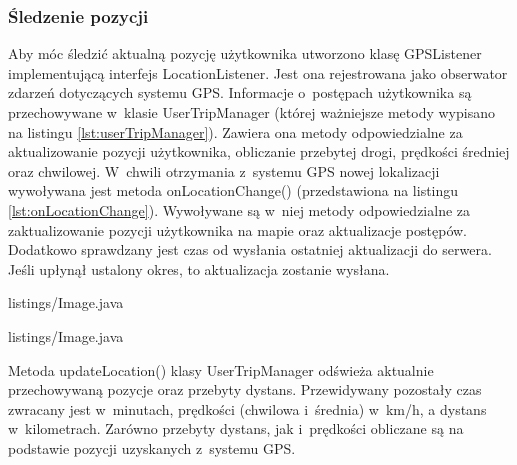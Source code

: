 \subsubsection{Śledzenie pozycji}
Aby móc śledzić aktualną pozycję użytkownika utworzono klasę
GPSListener implementującą interfejs LocationListener. Jest ona rejestrowana
jako obserwator zdarzeń dotyczących systemu GPS. Informacje o~postępach
użytkownika są przechowywane w~klasie UserTripManager (której ważniejsze metody
wypisano na listingu \ref{lst:userTripManager}). Zawiera ona metody
odpowiedzialne za aktualizowanie pozycji użytkownika, obliczanie przebytej
drogi, prędkości średniej oraz chwilowej. W~chwili otrzymania z~systemu GPS
nowej lokalizacji wywoływana jest metoda onLocationChange() (przedstawiona na
listingu \ref{lst:onLocationChange}). Wywoływane są w~niej metody odpowiedzialne
za zaktualizowanie pozycji użytkownika na mapie oraz aktualizacje postępów.
Dodatkowo sprawdzany jest czas od wysłania ostatniej aktualizacji do serwera.
Jeśli upłynął ustalony okres, to aktualizacja zostanie
 wysłana.


{listings/Image.java}


{listings/Image.java}

Metoda updateLocation() klasy UserTripManager odświeża aktualnie przechowywaną pozycje oraz przebyty dystans. Przewidywany pozostały czas zwracany jest w~minutach, prędkości (chwilowa i~średnia) w~km/h, a dystans w~kilometrach. Zarówno przebyty dystans, jak i~prędkości obliczane są na podstawie pozycji uzyskanych z~systemu GPS.


